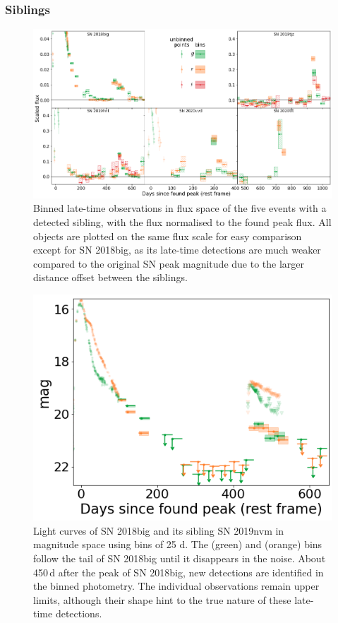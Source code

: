\documentclass[a4paper,oneside,12pt, class=Latex/Classes/PhDthesisPSnPDF, crop=false]{standalone}
\begin{document}
\subsubsection{Siblings}

\begin{figure}
 \centering
 \includegraphics[width=\textwidth]{../Images/chapter_3/sibling_norm_plots.png}
 \caption{Binned late-time observations in flux space of the five events with a detected sibling, with the flux normalised to the found peak flux. All objects are plotted on the same flux scale for easy comparison except for SN 2018big, as its late-time detections are much weaker compared to the original SN peak magnitude due to the larger distance offset between the siblings.}
 \label{sibling_plots}
\end{figure}

\begin{figure}
 \centering
 \includegraphics[width=\textwidth]{../Images/chapter_3/ted.png}
 \caption{Light curves of SN 2018big and its sibling SN 2019nvm in magnitude space using bins of 25 d. The \ztfg (green) and \ztfr (orange) bins follow the tail of SN 2018big until it disappears in the noise. About 450\,d after the peak of SN 2018big, new detections are identified in the binned photometry. The individual observations remain upper limits, although their shape hint to the true nature of these late-time detections.}
 \label{sibling_example}
\end{figure}
\end{document}
